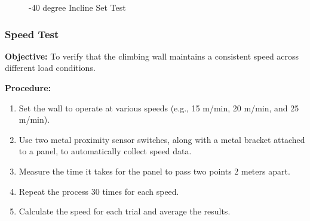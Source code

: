 \begin{figure}[H]
    \centering
    \caption{-40 degree Incline Set Test}
    \label{fig:incline_set_test}
\end{figure}

\subsubsection{Speed Test}
\textbf{Objective:} To verify that the climbing wall maintains a consistent speed across different load conditions.

\textbf{Procedure:}
\begin{enumerate}
    \item Set the wall to operate at various speeds (e.g., 15 m/min, 20 m/min, and 25 m/min).
    \item Use two metal proximity sensor switches, along with a metal bracket attached to a panel, to automatically collect speed data.
    \item Measure the time it takes for the panel to pass two points 2 meters apart.
    \item Repeat the process 30 times for each speed.
    \item Calculate the speed for each trial and average the results.
\end{enumerate}

